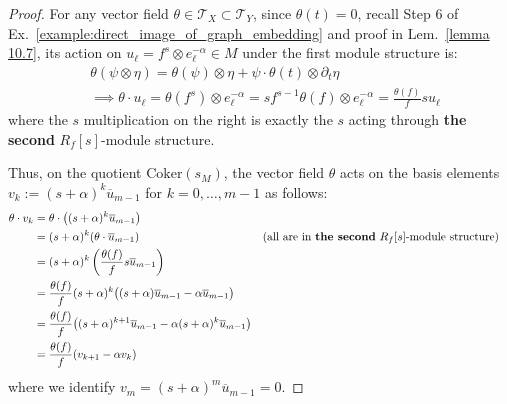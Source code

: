 \begin{proof}
    For any vector field $\theta \in \mathcal{T}_X \subset \mathcal{T}_Y$, since $\theta(t) = 0$,
    recall Step 6 of Ex.~\ref{example:direct_image_of_graph_embedding} and proof in Lem.~\ref{lemma 10.7},
    its action on $u_\ell = f^s \otimes e^{-\alpha}_\ell \in M$ under the first module structure is:
    \begin{align*}
         & \theta(\psi \otimes \eta) = \theta(\psi) \otimes \eta + \psi \cdot \theta(t) \otimes \partial_t \eta                                              \\
         & \implies \theta \cdot u_\ell = \theta(f^s) \otimes e^{-\alpha}_\ell = s f^{s-1} \theta(f) \otimes e^{-\alpha}_\ell = \frac{\theta(f)}{f} s u_\ell
    \end{align*}
    where the $s$ multiplication on the right is exactly the $s$ acting through \textbf{the second} $R_f[s]$-module structure.

    Thus, on the quotient $\mathrm{Coker}(s_M)$, the vector field $\theta$ acts on the basis elements $v_k := (s+\alpha)^k \overline u_{m-1}$ for $k = 0, \dots, m-1$ as follows:
    \begin{align*}
        \theta \cdot v_k & = \theta \cdot \big( (s+\alpha)^k \overline u_{m-1} \big)                                                                                                                           \\
                         & = (s+\alpha)^k (\theta \cdot \overline u_{m-1})                                                              &  & \text{(all are in \textbf{the second} $R_f[s]$-module structure)} \\
                         & = (s+\alpha)^k \left( \frac{\theta(f)}{f} s \overline u_{m-1} \right)                                                                                                               \\
                         & = \frac{\theta(f)}{f} (s+\alpha)^k \big( (s+\alpha) \overline u_{m-1} - \alpha \overline u_{m-1} \big)                                                                              \\
                         & = \frac{\theta(f)}{f} \big( (s+\alpha)^{k+1} \overline u_{m-1} - \alpha (s+\alpha)^k \overline u_{m-1} \big)                                                                        \\
                         & = \frac{\theta(f)}{f} (v_{k+1} - \alpha v_k)
    \end{align*}
    where we identify $v_m = (s+\alpha)^m \overline u_{m-1} = 0$.


\end{proof}
